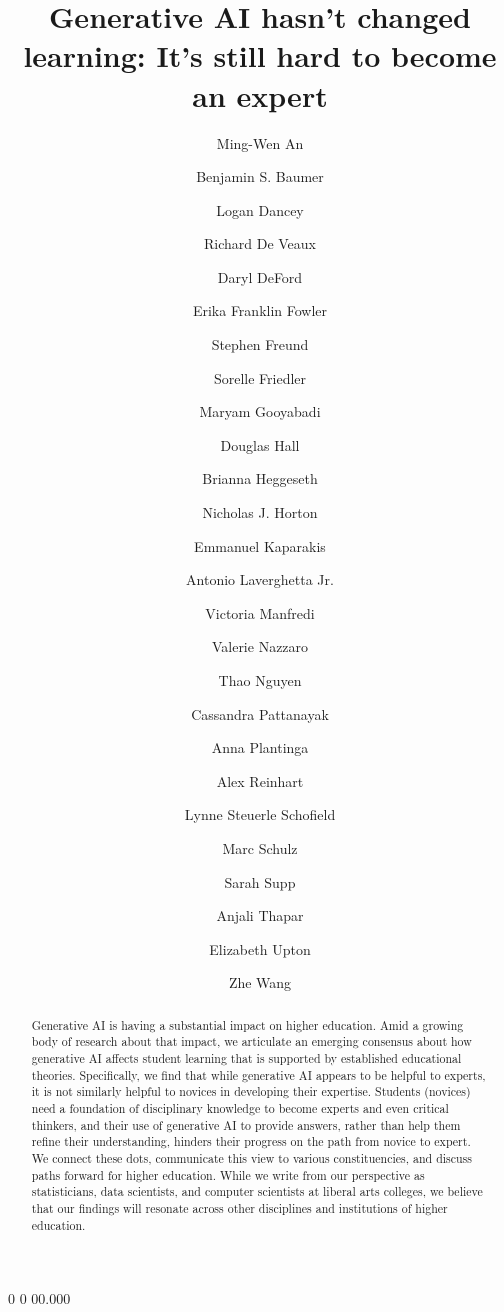 \documentclass[
]{hdsr}
\title{Generative AI hasn't changed learning: It's still hard to become
an expert}
\author{Ming-Wen An \and Benjamin S. Baumer \and Logan
Dancey \and Richard De Veaux \and Daryl DeFord \and Erika Franklin
Fowler \and Stephen Freund \and Sorelle Friedler \and Maryam
Gooyabadi \and Douglas Hall \and Brianna Heggeseth \and Nicholas J.
Horton \and Emmanuel Kaparakis \and Antonio Laverghetta
Jr. \and Victoria Manfredi \and Valerie Nazzaro \and Thao
Nguyen \and Cassandra Pattanayak \and Anna Plantinga \and Alex
Reinhart \and Lynne Steuerle Schofield \and Marc Schulz \and Sarah
Supp \and Anjali Thapar \and Elizabeth Upton \and Zhe Wang}
\date{}
\begin{document}



\volumeheader%
{0}%
{0}%
{00.000}

\maketitle

\thispagestyle{empty}

  

\begin{abstract}
Generative AI is having a substantial impact on higher education. Amid a
growing body of research about that impact, we articulate an emerging
consensus about how generative AI affects student learning that is
supported by established educational theories. Specifically, we find
that while generative AI appears to be helpful to experts, it is not
similarly helpful to novices in developing their expertise. Students
(novices) need a foundation of disciplinary knowledge to become experts
and even critical thinkers, and their use of generative AI to provide
answers, rather than help them refine their understanding, hinders their
progress on the path from novice to expert. We connect these dots,
communicate this view to various constituencies, and discuss paths
forward for higher education. While we write from our perspective as
statisticians, data scientists, and computer scientists at liberal arts
colleges, we believe that our findings will resonate across other
disciplines and institutions of higher education.
\end{abstract}
\end{document}

